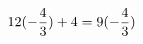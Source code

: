 \documentclass[preview]{standalone}
\begin{document}
\begin{align*}
\special{dvisvgm:raw <g id='unique000'>}12(- \frac{4}{3}) + 4 = 9(- \frac{4}{3})\special{dvisvgm:raw </g>}
\end{align*}
\end{document}

